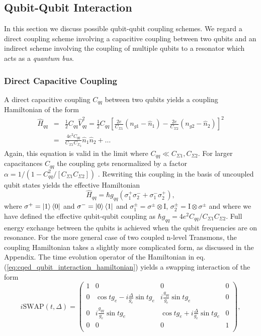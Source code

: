 \subsection{Qubit-Qubit Interaction}

In this section we discuss possible qubit-qubit coupling schemes. We regard a direct coupling scheme involving a capacitive coupling between two qubits and an indirect scheme involving the coupling of multiple qubits to a resonator which acts as a {\it quantum bus}.

\subsubsection{Direct Capacitive Coupling}

A direct capacitive coupling $C_{qq}$ between two qubits yields a coupling Hamiltonian of the form
%
\begin{eqnarray}
\hat{H}_{qq} & = & \frac{1}{2}C_{qq}\hat{V}_{qq}^2 = \frac{1}{2}C_{qq}\left[\frac{2e}{C_{\Sigma 1}}(n_{g1}-\hat{n}_1)-\frac{2e}{C_{\Sigma 2}}(n_{g2}-\hat{n}_2)\right]^2 \\
& = & \frac{4e^2 C_{qq}}{C_{\Sigma 1}C_{\Sigma_2}}\hat{n}_1\hat{n}_2+\hdots \label{eq:cqed_capacitive_coupling}
\end{eqnarray}
%
Again, this equation is valid in the limit where $C_{qq} \ll C_{\Sigma 1},C_{\Sigma 2}$. For larger capacitances $C_{qq}$ the coupling gets renormalized by a factor $\alpha = 1/(1-C_{qq}^2/[C_{\Sigma 1}C_{\Sigma 2}])$ \citep{nguyen_cooper_2008}. Rewriting this coupling in the basis of uncoupled qubit states yields the effective Hamiltonian
%
\begin{equation}
\hat{H}_{qq} = \hbar g_{qq}\left(\sigma^+_1\sigma^-_2+\sigma^-_1\sigma^+_2\right), \label{eq:cqed_qubit_interaction_hamiltonian}
\end{equation}
%
where $\sigma^+=\left| 1 \right>\left< 0 \right|$ and $\sigma^-=\left| 0 \right>\left< 1 \right|$ and $\sigma_1^\pm=\sigma^\pm\otimes \mathrm{I}$, $\sigma_2^\pm = \mathrm{I}\otimes \sigma^\pm$ and where we have defined the effective qubit-qubit coupling as $\hbar g_{qq} = 4e^2 C_{qq}/C_{\Sigma 1}C_{\Sigma 2}$. Full energy exchange between the qubits is achieved when the qubit frequencies are on resonance. For the more general case of two coupled n-level Transmons, the coupling Hamiltonian takes a slightly more complicated form, as discussed in the Appendix. The time evolution operator of the Hamiltonian in eq. (\ref{eq:cqed_qubit_interaction_hamiltonian}) yields a swapping interaction of the form
%
\begin{equation}
i\mathrm{SWAP}(t,\Delta) = \left(
			\begin{array}{cccc}
				1 & 0 & 0 & 0 \\
				0 & \cos{t g_{e}}-i\frac{\Delta}{g_e}\sin{t g_{e}} & i \frac{g_{qq}}{g_e}\sin{t g_{e}} & 0 \\
				0 & i\frac{g_{qq}}{g_e}\sin{t g_{e}} & \cos{t g_{e}}+i\frac{\Delta}{g_{e}}\sin{t g_{e}} & 0 \\
				0 & 0 & 0 & 1 \\
			\end{array}
	\right), \label{eq:swap_with_detuning}
\end{equation}
